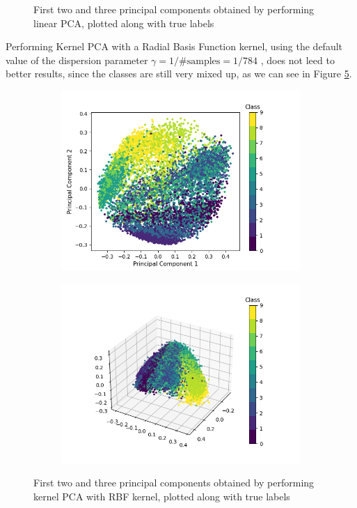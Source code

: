 \documentclass[12pt]{article}
\begin{document}
\begin{figure}[h]
\begin{subfigure}{0.5\textwidth}
		\label{fig:lpca_linear_3comps}
	\end{subfigure}
	\caption{First two and three principal components obtained by performing linear PCA, plotted along with true labels}
	\label{fig:pca_linear}
\end{figure}

Performing Kernel PCA with a Radial Basis Function kernel, using the default value of the dispersion parameter %
 $\gamma = 1/\mathrm{\# samples} = 1/784$ , does not leed to better results, since the classes are still very mixed up, as we can see in Figure \ref{fig:pca_rbf}.
 
\begin{figure}[h]
	\begin{subfigure}{0.5\textwidth}
		\includegraphics[width=0.4\textheight]{pca_rbf_2comps.png}
		\label{fig:pca_rbf_2comps}
	\end{subfigure}
	\begin{subfigure}{0.5\textwidth}
		\includegraphics[width=0.4\textheight]{pca_rbf_3comps.png}
		\label{fig:pca_rbf_3comps}
	\end{subfigure}
	\caption{First two and three principal components obtained by performing kernel PCA with RBF kernel, plotted along with true labels}
	\label{fig:pca_rbf}
\end{figure}
\end{document}
